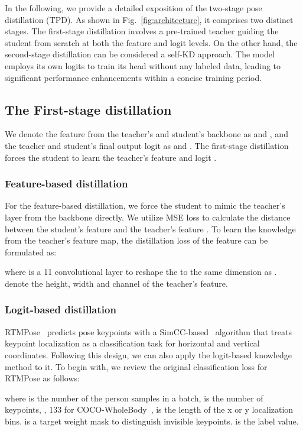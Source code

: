 \documentclass[10pt,twocolumn,letterpaper]{article}
\begin{document}
In the following, we provide a detailed exposition of the two-stage pose distillation (TPD). As shown in Fig.~\ref{fig:architecture}, it comprises two distinct stages. The first-stage distillation involves a pre-trained teacher guiding the student from scratch at both the feature and logit levels. On the other hand, the second-stage distillation can be considered a self-KD approach. The model employs its own logits to train its head without any labeled data, leading to significant performance enhancements within a concise training period.

\subsection{The First-stage distillation}

We denote the feature from the teacher's and student's backbone as  and , and the teacher and student's final output logit as  and . The first-stage distillation forces the student to learn the teacher's feature  and logit .

\subsubsection{Feature-based distillation}
For the feature-based distillation, we force the student to mimic the teacher's layer from the backbone directly. We utilize MSE loss to calculate the distance between the student's feature  and the teacher's feature . To learn the knowledge from the teacher's feature map, the distillation loss of the feature can be formulated as:

where  is a 11 convolutional layer to reshape the  to the same dimension as .  denote the height, width and channel of the teacher's feature.

\subsubsection{Logit-based distillation}
RTMPose~\cite{jiang2023rtmpose} predicts pose keypoints with a SimCC-based~\cite{li2022simcc} algorithm that treats keypoint localization as a classification task for horizontal and vertical coordinates. Following this design, we can also apply the logit-based knowledge method to it. To begin with, we review the original classification loss for RTMPose as follows:

where  is the number of the person samples in a batch,  is the number of keypoints, \eg, 133 for COCO-WholeBody~\cite{jin2020whole},  is the length of the x or y localization bins.  is a target weight mask to distinguish invisible keypoints.  is the label value.
\end{document}
